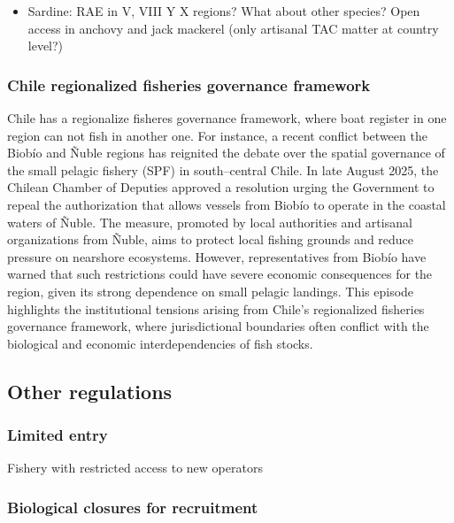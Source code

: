 \documentclass[
  11pt,
]{article}
\providecommand{\tightlist}{%
  \setlength{\itemsep}{0pt}\setlength{\parskip}{0pt}}
\begin{document}
\begin{itemize}
\tightlist
\item
  Sardine: RAE in V, VIII Y X regions? What about other species? Open
  access in anchovy and jack mackerel (only artisanal TAC matter at
  country level?)
\end{itemize}

\subsubsection{Chile regionalized fisheries governance framework}\label{chile-regionalized-fisheries-governance-framework}

Chile has a regionalize fisheres governance framework, where boat
register in one region can not fish in another one. For instance, a
recent conflict between the Biobío and Ñuble regions has reignited the
debate over the spatial governance of the small pelagic fishery (SPF) in
south--central Chile. In late August 2025, the Chilean Chamber of
Deputies approved a resolution urging the Government to repeal the
authorization that allows vessels from Biobío to operate in the coastal
waters of Ñuble. The measure, promoted by local authorities and
artisanal organizations from Ñuble, aims to protect local fishing
grounds and reduce pressure on nearshore ecosystems. However,
representatives from Biobío have warned that such restrictions could
have severe economic consequences for the region, given its strong
dependence on small pelagic landings. This episode highlights the
institutional tensions arising from Chile's regionalized fisheries
governance framework, where jurisdictional boundaries often conflict
with the biological and economic interdependencies of fish stocks.

\subsection{Other regulations}\label{other-regulations}

\subsubsection{Limited entry}\label{limited-entry}

Fishery with restricted access to new operators

\subsubsection{Biological closures for recruitment}\label{biological-closures-for-recruitment}
\end{document}
